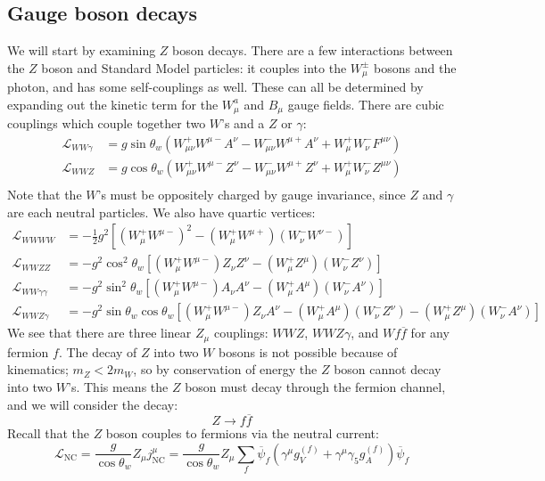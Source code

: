 \documentclass[11pt, oneside]{article}   	%
\theoremstyle{definition}
\numberwithin{equation}{subsection}		%
\begin{document}
\subsection{Gauge boson decays}
We will start by examining $Z$ boson decays. There are a few interactions between the $Z$ boson and Standard Model particles: it couples 
into the $W_\mu^\pm$ bosons and the photon, and has some self-couplings as well. These can all be determined by expanding out the 
kinetic term for the $W_\mu^a$ and $B_\mu$ gauge fields. There are cubic couplings which couple together two $W$'s and a $Z$ or 
$\gamma$:
\begin{align}
	\mathcal L_{WW\gamma} &= g\sin\theta_w \left( W_{\mu\nu}^+ W^{\mu -} A^\nu - W_{\mu\nu}^- W^{\mu +} A^\nu + W_\mu^+ W_\nu^- 
	F^{\mu\nu}\right) \\
	\mathcal L_{WWZ} &= g\cos\theta_w \left( W_{\mu\nu}^+ W^{\mu -} Z^\nu - W_{\mu\nu}^- W^{\mu +} Z^\nu + W_\mu^+ W_\nu^- 
	Z^{\mu\nu}\right) \\
\end{align}
Note that the $W$'s must be oppositely charged by gauge invariance, since $Z$ and $\gamma$ are each neutral particles. 
We also have quartic vertices:
\begin{align}
	\mathcal L_{WWWW} &= -\frac{1}{2} g^2 \left[(W_\mu^+ W^{\mu -})^2 - (W_\mu^+ W^{\mu +}) (W_\nu^- W^{\nu -})\right] \\
	\mathcal L_{WWZZ} &= -g^2 \cos^2\theta_w \left[(W_\mu^+ W^{\mu -})Z_\nu Z^\nu - (W_\mu^+ Z^\mu) (W_\nu^- Z^\nu)\right] \\
	\mathcal L_{WW\gamma\gamma} &= -g^2 \sin^2\theta_w \left[(W_\mu^+ W^{\mu -})A_\nu A^\nu - (W_\mu^+ A^\mu) (W_\nu^- A^\nu)
	\right] \\
	\mathcal L_{WWZ\gamma} &= -g^2 \sin\theta_w\cos\theta_w \left[(W_\mu^+ W^{\mu -})Z_\nu A^\nu - (W_\mu^+ A^\mu) (W_\nu^- 
	Z^\nu) - (W_\mu^+ Z^\mu) (W_\nu^- A^\nu)\right]
\end{align}
We see that there are three linear $Z_\mu$ couplings: $WWZ$, $WWZ\gamma$, and $Wf\overline f$ for any fermion $f$. The decay of $Z$ into two 
$W$ bosons is not possible because of kinematics; $m_Z < 2 m_W$, so by conservation of energy the $Z$ boson cannot decay into two $W$'s. This means 
the $Z$ boson must decay through the fermion channel, and we will consider the decay:
\begin{equation}
	Z\rightarrow f\overline f
\end{equation}
Recall that the $Z$ boson couples to fermions via the neutral current:
\begin{equation}
	\mathcal L_\mathrm{NC} = \frac{g}{\cos\theta_w} Z_\mu j^\mu_\mathrm{NC} = \frac{g}{\cos\theta_w} Z_\mu \sum_f \overline\psi_f \left(\gamma^\mu g_V^{(f)} + 
	\gamma^\mu\gamma_5 g_A^{(f)}\right) \overline \psi_f
\end{equation}
\end{document}
